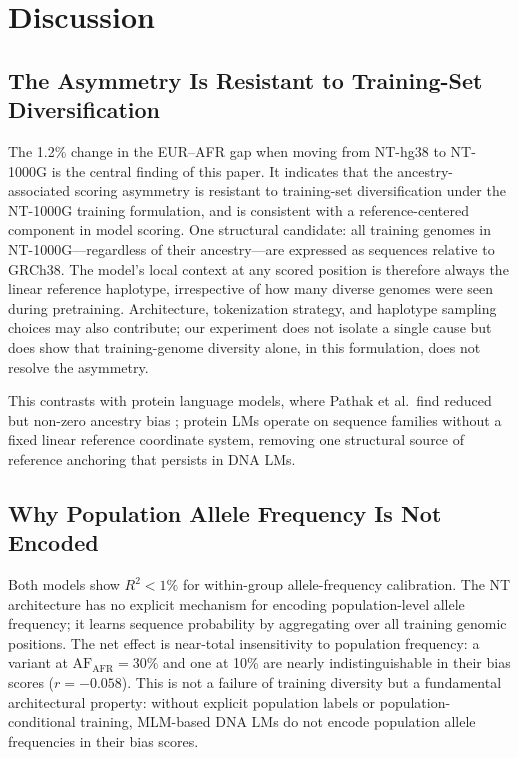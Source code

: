 \documentclass[conference]{IEEEtran}
\begin{document}
\section{Discussion}

\subsection{The Asymmetry Is Resistant to Training-Set Diversification}

The 1.2\% change in the EUR--AFR gap when moving from NT-hg38 to NT-1000G is
the central finding of this paper. It indicates that the ancestry-associated
scoring asymmetry is resistant to training-set diversification under the
NT-1000G training formulation, and is consistent with a reference-centered
component in model scoring. One structural candidate: all training genomes in
NT-1000G---regardless of their ancestry---are expressed as sequences relative
to GRCh38. The model's local context at any scored position is therefore always
the linear reference haplotype, irrespective of how many diverse genomes were
seen during pretraining. Architecture, tokenization strategy, and haplotype
sampling choices may also contribute; our experiment does not isolate a single
cause but does show that training-genome diversity alone, in this formulation,
does not resolve the asymmetry.

This contrasts with protein language models, where Pathak et al.\ find reduced
but non-zero ancestry bias \cite{pathak_2024}; protein LMs operate on
sequence families without a fixed linear reference coordinate system, removing
one structural source of reference anchoring that persists in DNA LMs.

\subsection{Why Population Allele Frequency Is Not Encoded}

Both models show $R^2{<}1\%$ for within-group allele-frequency calibration.
The NT architecture has no explicit mechanism for encoding population-level
allele frequency; it learns sequence probability by aggregating over all training
genomic positions. The net effect is near-total insensitivity to population
frequency: a variant at $\text{AF}_\text{AFR}{=}30\%$ and one at 10\% are
nearly indistinguishable in their bias scores ($r{=}-0.058$). This is not a
failure of training diversity but a fundamental architectural property: without
explicit population labels or population-conditional training, MLM-based DNA LMs
do not encode population allele frequencies in their bias scores.
\end{document}
